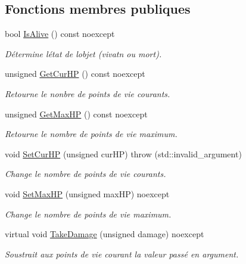 \subsection*{Fonctions membres publiques}
\begin{DoxyCompactItemize}
\item 
bool \hyperlink{classmy_1_1AliveObject_ae3d7fb84f66db19cd49e238405590d40}{Is\+Alive} () const noexcept
\begin{DoxyCompactList}\small\item\em Détermine l\textquotesingle{}état de l\textquotesingle{}objet (vivatn ou mort). \end{DoxyCompactList}\item 
unsigned \hyperlink{classmy_1_1AliveObject_ad5c35dbc2ccd74c9edd73fb19b89e6bb}{Get\+Cur\+HP} () const noexcept
\begin{DoxyCompactList}\small\item\em Retourne le nonbre de points de vie courants. \end{DoxyCompactList}\item 
unsigned \hyperlink{classmy_1_1AliveObject_a4537ba5f7d099b5ae2bd59b6db93a76b}{Get\+Max\+HP} () const noexcept
\begin{DoxyCompactList}\small\item\em Retourne le nombre de points de vie maximum. \end{DoxyCompactList}\item 
void \hyperlink{classmy_1_1AliveObject_ae3cf3e26f9fc6b497d8b659621d3ffa8}{Set\+Cur\+HP} (unsigned cur\+HP)  throw (std\+::invalid\+\_\+argument)
\begin{DoxyCompactList}\small\item\em Change le nombre de points de vie courants. \end{DoxyCompactList}\item 
void \hyperlink{classmy_1_1AliveObject_aea104f1424ccb0e2ebca84bd0fba3029}{Set\+Max\+HP} (unsigned max\+HP) noexcept
\begin{DoxyCompactList}\small\item\em Change le nombre de points de vie maximum. \end{DoxyCompactList}\item 
virtual void \hyperlink{classmy_1_1AliveObject_a4c13171af7b862e15bfd1737a75dab75}{Take\+Damage} (unsigned damage) noexcept
\begin{DoxyCompactList}\small\item\em Soustrait aux points de vie courant la valeur passé en argument. \end{DoxyCompactList}\end{DoxyCompactItemize}
